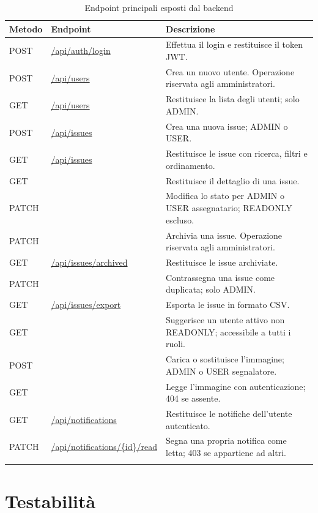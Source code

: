 \documentclass[12pt,a4paper]{article}
\begin{document}
\begin{longtable}{
    L{0.13\textwidth}
    L{0.40\textwidth}
    p{0.37\textwidth}
}
\toprule
\textbf{Metodo} & \textbf{Endpoint} & \textbf{Descrizione} \\
\midrule
\endhead
POST & \url{/api/auth/login} &
Effettua il login e restituisce il token JWT. \\
POST & \url{/api/users} &
Crea un nuovo utente. Operazione riservata agli amministratori. \\
GET & \url{/api/users} &
Restituisce la lista degli utenti; solo ADMIN. \\
POST & \url{/api/issues} &
Crea una nuova issue; ADMIN o USER. \\
GET & \url{/api/issues} &
Restituisce le issue con ricerca, filtri e ordinamento. \\
GET &  &
Restituisce il dettaglio di una issue. \\
PATCH &  &
Modifica lo stato per ADMIN o USER assegnatario; READONLY escluso. \\
PATCH &  &
Archivia una issue. Operazione riservata agli amministratori. \\
GET & \url{/api/issues/archived} &
Restituisce le issue archiviate. \\
PATCH &  &
Contrassegna una issue come duplicata; solo ADMIN. \\
GET & \url{/api/issues/export} &
Esporta le issue in formato CSV. \\
GET &  &
Suggerisce un utente attivo non READONLY; accessibile a tutti i ruoli. \\
POST &  &
Carica o sostituisce l'immagine; ADMIN o USER segnalatore. \\
GET &  &
Legge l'immagine con autenticazione; 404 se assente. \\
GET & \url{/api/notifications} &
Restituisce le notifiche dell'utente autenticato. \\
PATCH & \url{/api/notifications/{id}/read} &
Segna una propria notifica come letta; 403 se appartiene ad altri. \\

\bottomrule
\caption{Endpoint principali esposti dal backend}\label{tab:endpoint-backend}
\end{longtable}
\endgroup

\clearpage
\section{Testabilità}
\end{document}

